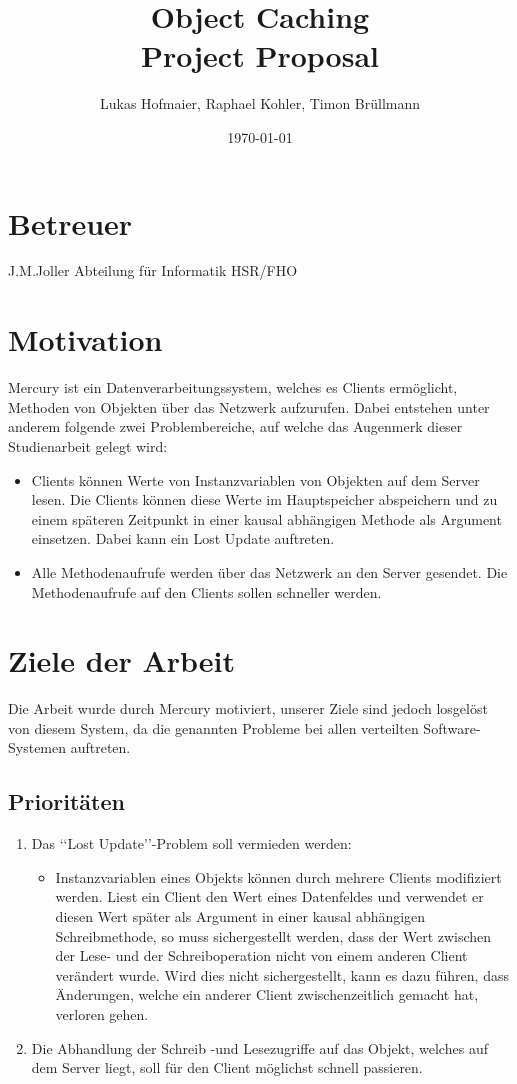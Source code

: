 \documentclass{article}
\title{Object Caching\\Project Proposal}
\author{Lukas Hofmaier, Raphael Kohler, Timon Brüllmann}
\date{\today}
\begin{document}
\maketitle
\vspace{1cm}
\section{Betreuer}
J.M.Joller  Abteilung für Informatik HSR/FHO

\section{Motivation}
Mercury ist ein Datenverarbeitungssystem, welches es Clients ermöglicht, Methoden von Objekten über das Netzwerk aufzurufen. Dabei entstehen unter anderem folgende zwei Problembereiche, auf welche das Augenmerk dieser Studienarbeit gelegt wird:

\begin{itemize}
\item Clients können Werte von Instanzvariablen von Objekten auf dem Server lesen. Die Clients können diese Werte im Hauptspeicher abspeichern und zu einem späteren Zeitpunkt in einer kausal abhängigen Methode als Argument einsetzen. Dabei kann ein Lost Update auftreten.
\item Alle Methodenaufrufe werden über das Netzwerk an den Server gesendet. Die Methodenaufrufe auf den Clients sollen schneller werden.
\end{itemize}

\section{Ziele der Arbeit}
Die Arbeit wurde durch Mercury motiviert, unserer Ziele sind jedoch losgelöst von diesem System, da die genannten Probleme bei allen verteilten Software-Systemen auftreten.

\subsection{Prioritäten}
\label{sec:prioritaeten}

\begin{enumerate}
\item Das ‘‘Lost Update’’-Problem soll vermieden werden:
\begin{itemize}
\item Instanzvariablen eines Objekts können durch mehrere Clients
  modifiziert werden. Liest ein Client den Wert eines Datenfeldes und
  verwendet er diesen Wert später als Argument in einer kausal
  abhängigen Schreibmethode, so muss sichergestellt werden, dass der Wert
  zwischen der Lese- und der Schreiboperation nicht von einem anderen
  Client verändert wurde. Wird dies nicht sichergestellt, kann es dazu führen, dass Änderungen, welche ein anderer Client zwischenzeitlich gemacht hat, verloren gehen.
\end{itemize}
\item Die Abhandlung der Schreib -und Lesezugriffe auf das Objekt, welches auf dem Server liegt, soll für den Client möglichst schnell passieren.
\end{enumerate}
\end{document}
